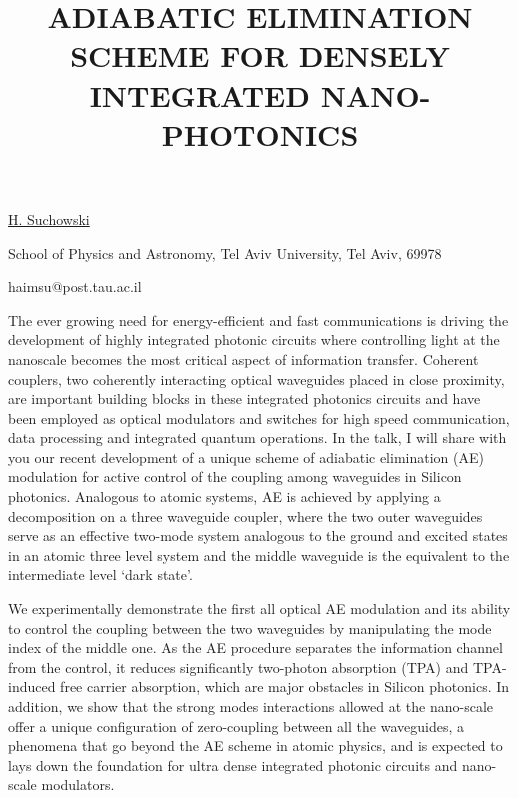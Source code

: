 \title{ADIABATIC ELIMINATION SCHEME FOR DENSELY INTEGRATED NANO-PHOTONICS}

\underline{H. Suchowski} 

{\normalsize{
\vspace{-4mm}
School of Physics and Astronomy,
Tel Aviv University, Tel Aviv, 69978

\email haimsu@post.tau.ac.il}}

The ever growing need for energy-efficient and fast communications is driving the development of highly integrated photonic circuits where controlling light at the nanoscale becomes the most critical aspect of information transfer. Coherent couplers, two coherently interacting optical waveguides placed in close proximity, are important building blocks in these integrated photonics circuits and have been employed as optical modulators and switches for high speed communication, data processing and integrated quantum operations. In the talk, I will share with you our recent development of a unique scheme of adiabatic elimination (AE) modulation for active control of the coupling among waveguides in Silicon photonics. Analogous to atomic systems, AE is achieved by applying a decomposition on a three waveguide coupler, where the two outer waveguides serve as an effective two-mode system analogous to the ground and excited states in an atomic three level system and the middle waveguide is the equivalent to the intermediate level `dark state'.

We experimentally demonstrate the first all optical AE modulation and its ability to control the coupling between the two waveguides by manipulating the mode index of the middle one. As the AE procedure separates the information channel from the control, it reduces significantly two-photon absorption (TPA) and TPA-induced free carrier absorption, which are major obstacles in Silicon photonics. In addition, we show that the strong modes interactions allowed at the nano-scale offer a unique configuration of zero-coupling between all the waveguides, a phenomena that go beyond the AE scheme in atomic physics, and is expected to lays down the foundation for ultra dense integrated photonic circuits and nano-scale modulators.

\vspace{\baselineskip}

